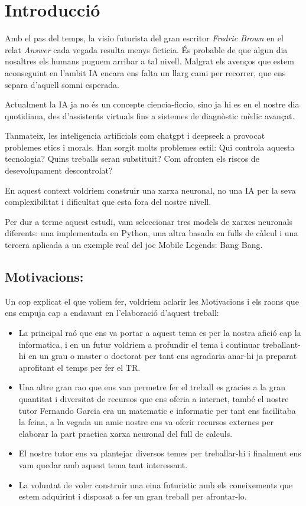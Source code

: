 \chapter{Introducció}
\label{c:intro}

Amb el pas del temps, la visio futurista del gran escritor \textit{Fredric Brown} en el relat \emph{Answer} cada vegada resulta menys ficticia. És probable de que algun dia nosaltres els humans puguem arribar a tal nivell. Malgrat els avenços que estem aconseguint en l'ambit IA encara ens falta un llarg cami per recorrer, que ens separa d'aquell somni esperada.

Actualment la IA ja no és un concepte ciencia-ficcio, sino ja hi es en el nostre dia quotidiana, des d’assistents virtuals fins a sistemes de diagnòstic mèdic avançat.

Tanmateix, les inteligencia artificials com chatgpt i deepseek a provocat problemes etics i morals. Han sorgit molts problemes estil: Qui controla aquesta tecnologia? Quins treballs seran substituït? Com afronten els riscos de desevolupament descontrolat?

En aquest context voldriem construir una xarxa neuronal, no una IA per la seva complexibilitat i dificultat que esta fora del nostre nivell.

Per dur a terme aquest estudi, vam seleccionar tres models de xarxes neuronals diferents: una implementada en Python, una altra basada en fulls de càlcul i una tercera aplicada a un exemple real del joc Mobile Legends: Bang Bang.

\section{Motivacions:}
Un cop explicat el que voliem fer, voldriem aclarir les Motivacions i els raons que ens empuja cap a endavant en l'elaboració d'aquest treball:

\begin{itemize}
 \item La principal raó que ens va portar a aquest tema es per la nostra afició cap la informatica, i en un futur voldriem a profundir el tema i continuar treballant-hi en un grau o master o doctorat per tant ens agradaria anar-hi ja preparat aprofitant el temps per fer el TR.

 \item Una altre gran rao que ens van permetre fer el treball es gracies a la gran quantitat i diversitat de  recursos que ens oferia a internet, també el nostre tutor Fernando Garcia era un matematic e informatic per tant ens facilitaba la feina, a la vegada un amic nostre ens va oferir recursos externes per elaborar la part practica xarxa neuronal del full de calculs.

 \item El nostre tutor ens va plantejar diversos temes per treballar-hi i finalment ens vam quedar amb aquest tema tant interessant.

 \item La voluntat de voler construir una eina futuristic amb els coneixements que estem adquirint i disposat a fer un gran treball per afrontar-lo.

\end{itemize}


